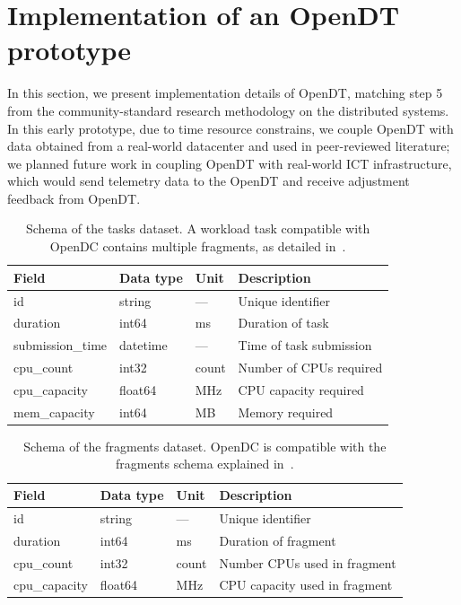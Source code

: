 \section{Implementation of an OpenDT prototype}\label{sec:prototype}
In this section, we present implementation details of OpenDT, matching step 5 from the community-standard research methodology on the distributed systems. In this early prototype, due to time resource constrains, we couple OpenDT with data obtained from a real-world datacenter and used in peer-reviewed literature; we planned future work in coupling OpenDT with real-world ICT infrastructure, which would send telemetry data to the OpenDT and receive adjustment feedback from OpenDT.

\begin{table}[t]
\centering
\renewcommand{\arraystretch}{1.1}
\begin{tabularx}{\linewidth}{l l l X}
\toprule
\textbf{Field} & \textbf{Data type} & \textbf{Unit} & \textbf{Description} \\
\midrule
id               & string   & —    & Unique identifier \\
duration         & int64    & ms   & Duration of task \\
submission\_time  & datetime & —    & Time of task submission \\
cpu\_count       & int32    & count& Number of CPUs required \\
cpu\_capacity     & float64  & MHz  & CPU capacity required \\
mem\_capacity     & int64    & MB   & Memory required \\
\bottomrule
\end{tabularx}
\caption{Schema of the tasks dataset. A workload task compatible with OpenDC contains multiple fragments, as detailed in~\cite{opendc-workload}.}
\label{tab:tasks_schema}
\end{table}


\begin{table}[t]
\centering
\renewcommand{\arraystretch}{1.1}
\begin{tabularx}{\linewidth}{l l l X}
\toprule
\textbf{Field} & \textbf{Data type} & \textbf{Unit} & \textbf{Description} \\
\midrule
id            & string  & —    & Unique identifier \\
duration      & int64   & ms   & Duration of fragment \\
cpu\_count     & int32   & count& Number CPUs used in fragment \\
cpu\_capacity  & float64 & MHz  & CPU capacity used in fragment \\
\bottomrule
\end{tabularx}
\caption{Schema of the fragments dataset. OpenDC is compatible with the fragments schema explained in~\cite{opendc-workload}.}
\label{tab:fragments_schema}
\end{table}


